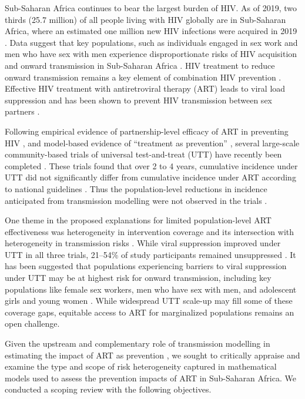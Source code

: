 Sub-Saharan Africa continues to bear the largest burden of HIV.
As of 2019, two thirds (25.7 million) of all people living with HIV globally are in Sub-Saharan Africa, where
an estimated one million new HIV infections were acquired in 2019 \cite{AIDSinfo}.
Data suggest that key populations, such as individuals engaged in sex work and men who have sex with men experience
disproportionate risks of HIV acquisition and onward transmission in Sub-Saharan Africa
\cite{Baral2012,Beyrer2012,Mishra2012,Boily2015}.
HIV treatment to reduce onward transmission remains a key element of combination HIV prevention \cite{WHO2016ART}.
Effective HIV treatment with antiretroviral therapy (ART) leads to viral load suppression
and has been shown to prevent HIV transmission between sex partners \cite{Lundgren2015,Danel2015,Cohen2016}.
\par
Following empirical evidence of partnership-level efficacy of ART
in preventing HIV \cite{Lundgren2015,Danel2015,Cohen2016},
and model-based evidence of ``treatment as prevention'' \cite{Granich2009,Eaton2012,Cori2014},
several large-scale community-based trials of universal test-and-treat (UTT)
have recently been completed \cite{Iwuji2018,Havlir2019,Hayes2019}.
These trials found that over 2 to 4 years,
cumulative incidence under UTT did not significantly differ from
cumulative incidence under ART according to national guidelines \cite{Havlir2019,Hayes2019,Iwuji2018}.
Thus the population-level reductions in incidence anticipated from transmission modelling
were not observed in the trials \cite{Baral2019,Havlir2020}.
\par
One theme in the proposed explanations for limited population-level ART effectiveness
was heterogeneity in intervention coverage and its intersection with
heterogeneity in transmission risks \cite{AbdoolKarim2019,Baral2019}.
While viral suppression improved under UTT in all three trials,
21--54\% of study participants remained unsuppressed \cite{Iwuji2018,Havlir2019,Hayes2019}.
It has been suggested that populations experiencing barriers to viral suppression under UTT
may be at highest risk for onward transmission, including key populations like
female sex workers, men who have sex with men, and adolescent girls and young women
\cite{Hakim2018,Nyato2019,Green2020}.
While widespread UTT scale-up may fill some of these coverage gaps,
equitable access to ART for marginalized populations remains an open challenge.
\par
Given the upstream and complementary role of transmission modelling
in estimating the impact of ART as prevention \cite{Eaton2012,Delva2012},
we sought to critically appraise and examine the type and scope of risk heterogeneity captured
in mathematical models used to assess the prevention impacts of ART in Sub-Saharan Africa.
We conducted a scoping review with the following objectives.
